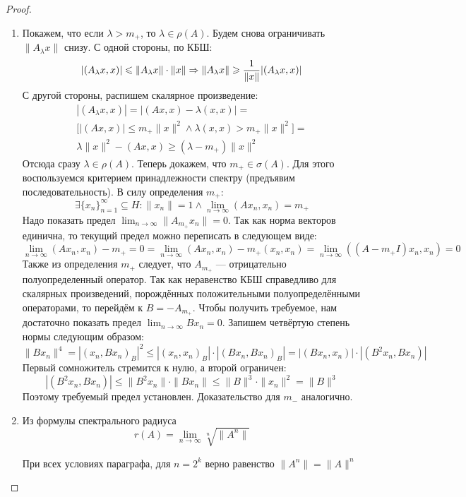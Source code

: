 \begin{proof}~
	\begin{enumerate}
		\item Покажем, что если $\lambda > m_+$, то $\lambda \in \rho(A)$. Будем снова ограничивать $\|A_\lambda x\|$ снизу. С одной стороны, по КБШ:
		\[
			|(A_\lambda x, x)| \leqslant \|A_\lambda x\| \cdot \|x\| \Rightarrow \|A_\lambda x\| \geqslant \frac{1}{\|x\|}|(A_\lambda x, x)|
		\]
		С другой стороны, распишем скалярное произведение:
		\begin{multline*}
			|(A_\lambda x, x)| = |(Ax, x) - \lambda(x, x)| =
			\\
			\Big[|(Ax, x)| \le m_+\|x\|^2 \wedge \lambda(x, x) > m_+\|x\|^2\Big] =
			\\
			\lambda\|x\|^2 - (Ax, x) \ge (\lambda - m_+)\|x\|^2
		\end{multline*}
		Отсюда сразу $\lambda \in \rho(A)$. Теперь докажем, что $m_+ \in \sigma(A)$. Для этого воспользуемся критерием принадлежности спектру (предъявим последовательность). В силу определения $m_+$:
		\[
			\exists \{x_n\}_{n = 1}^\infty \subseteq H \colon \|x_n\| = 1 \wedge \lim_{n \to \infty} (Ax_n, x_n) = m_+
		\]
		Надо показать предел $\lim_{n \to \infty} \|A_{m_+}x_n\| = 0$. Так как норма векторов единична, то текущий предел можно переписать в следующем виде:
		\[
			\lim_{n \to \infty} (Ax_n, x_n) - m_+ = 0 = \lim_{n \to \infty} (Ax_n, x_n) - m_+(x_n, x_n) = \lim_{n \to \infty} ((A - m_+I)x_n, x_n) = 0
		\]
		Также из определения $m_+$ следует, что $A_{m_+}$ --- отрицательно полуопределенный оператор. Так как неравенство КБШ справедливо для скалярных произведений, порождённых положительными полуопределёнными операторами, то перейдём к $B = -A_{m_+}$. Чтобы получить требуемое, нам достаточно показать предел $\lim_{n \to \infty} Bx_n = 0$. Запишем четвёртую степень нормы следующим образом:
		\[
			\|Bx_n\|^4 = |(x_n, Bx_n)_B|^2 \le |(x_n, x_n)_B| \cdot |(Bx_n, Bx_n)_B| = |(Bx_n, x_n)| \cdot |(B^2x_n, Bx_n)|
		\]
		Первый сомножитель стремится к нулю, а второй ограничен:
		\[
			|(B^2x_n, Bx_n)| \le \|B^2x_n\| \cdot \|Bx_n\| \le \|B\|^3 \cdot \|x_n\|^2 = \|B\|^3
		\]
		Поэтому требуемый предел установлен. Доказательство для $m_-$ аналогично.
		
		\item Из формулы спектрального радиуса
		\[
			r(A) = \lim_{n \to \infty} \sqrt[n]{\|A^n\|}
		\]
		\begin{lemma}
			При всех условиях параграфа, для $n = 2^k$ верно равенство $\|A^n\| = \|A\|^n$
		\end{lemma}
		

\end{enumerate}
\end{proof}
